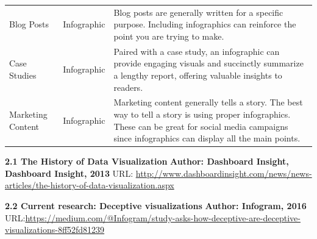 \documentclass[]{book}
\theoremstyle{definition}
\theoremstyle{definition}
\theoremstyle{definition}
\theoremstyle{remark}
\begin{document}
\begin{longtable}[]{@{}lll@{}}
\begin{minipage}[t]{0.11\columnwidth}\raggedright\strut
Blog Posts\strut
\end{minipage} & \begin{minipage}[t]{0.34\columnwidth}\raggedright\strut
Infographic\strut
\end{minipage} & \begin{minipage}[t]{0.13\columnwidth}\raggedright\strut
Blog posts are generally written for a specific purpose. Including
infographics can reinforce the point you are trying to make.\strut
\end{minipage}\tabularnewline
\begin{minipage}[t]{0.11\columnwidth}\raggedright\strut
Case Studies\strut
\end{minipage} & \begin{minipage}[t]{0.34\columnwidth}\raggedright\strut
Infographic\strut
\end{minipage} & \begin{minipage}[t]{0.13\columnwidth}\raggedright\strut
Paired with a case study, an infographic can provide engaging visuals
and succinctly summarize a lengthy report, offering valuable insights to
readers.\strut
\end{minipage}\tabularnewline
\begin{minipage}[t]{0.11\columnwidth}\raggedright\strut
Marketing Content\strut
\end{minipage} & \begin{minipage}[t]{0.34\columnwidth}\raggedright\strut
Infographic\strut
\end{minipage} & \begin{minipage}[t]{0.13\columnwidth}\raggedright\strut
Marketing content generally tells a story. The best way to tell a story
is using proper infographics. These can be great for social media
campaigns since infographics can display all the main points.\strut
\end{minipage}\tabularnewline
\bottomrule
\end{longtable}

\textbf{2.1 The History of Data Visualization} \textbf{Author: Dashboard
Insight, Dashboard Insight, 2013} URL:
\url{http://www.dashboardinsight.com/news/news-articles/the-history-of-data-visualization.aspx}

\textbf{2.2 Current research: Deceptive visualizations} \textbf{Author:
Infogram, 2016}
URL:\url{https://medium.com/@Infogram/study-asks-how-deceptive-are-deceptive-visualizations-8ff52fd81239}
\end{document}
